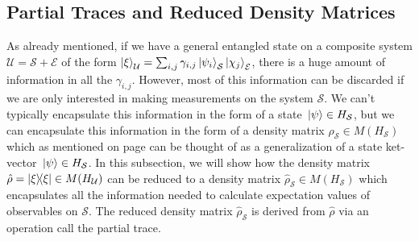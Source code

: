 \documentclass[letter, 12pt]{turabian-thesis}
\theoremstyle{hypothesis}
\begin{document}
\subsection{Partial Traces and Reduced Density Matrices}
As already mentioned, if we have a general entangled state on a composite system $\mathcal{U}=\mathcal{S}+\mathcal{E}$ of the form  $\ket{\xi}_\mathcal{U}=\sum_{i,j}\gamma_{i,j}\ket{\psi_i}_\mathcal{S}\ket{\chi_j}_\mathcal{E}$, there is a huge amount of information in all the $\gamma_{i,j}$. However, most of this information can be discarded if we are only interested in making measurements on the system $\mathcal{S}$. We can't typically encapsulate this information in the form of a state $\ket*{\psi}\in H_\mathcal{S}$, but we can encapsulate this information in the form of a density matrix $\hat{\rho}_\mathcal{S}\in M(H_\mathcal{S})$ which as mentioned on page \pageref{genket} can be thought of as a generalization of a state ket-vector $\ket*{\psi}\in H_\mathcal{S}$. In this subsection, we will show how the density matrix $\hat{\rho}=\dyad{\xi}\in M(H_\mathcal{U})$ can be reduced to a density matrix $\hat{\rho}_\mathcal{S}\in M(H_\mathcal{S})$ which encapsulates all the information needed to calculate expectation values of observables on $\mathcal{S}$. The reduced density matrix $\hat{\rho}_\mathcal{S}$ is derived from $\hat{\rho}$ via an operation call the partial trace.
\end{document}
